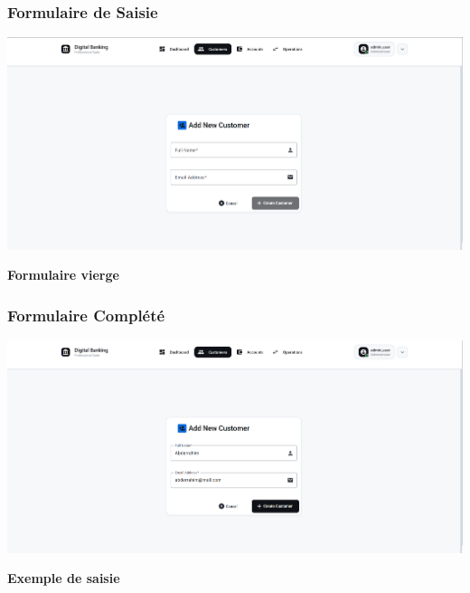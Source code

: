 \documentclass[10pt]{article}
\begin{document}
\begin{minipage}{\textwidth}
    \begin{minipage}{0.48\textwidth}
        \subsubsection{Formulaire de Saisie}
        \begin{imagebox}
            \includegraphics[width=\textwidth]{screenshots/04_02_customer_form_new_empty.png}
            \caption*{\textbf{\sffamily\small Formulaire vierge}}
        \end{imagebox}
    \end{minipage}
    \hfill
    \begin{minipage}{0.48\textwidth}
        \subsubsection{Formulaire Complété}
        \begin{imagebox}
            \includegraphics[width=\textwidth]{screenshots/04_03_customer_form_new_filled.png}
            \caption*{\textbf{\sffamily\small Exemple de saisie}}
        \end{imagebox}
    \end{minipage}
\end{minipage}
\end{document}
